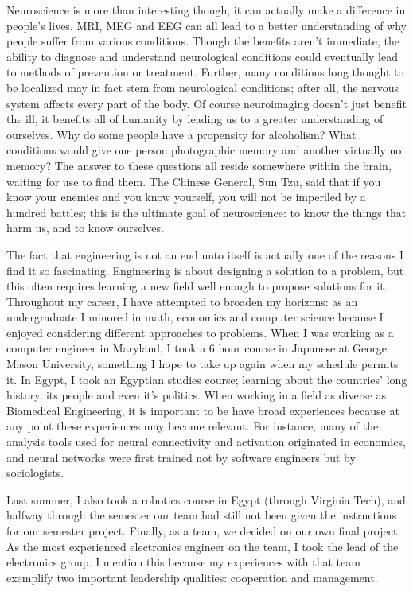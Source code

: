 \documentclass[12pt]{article}
\begin{document}
Neuroscience is more than interesting though, it
can actually make a difference in people's lives. 
MRI, MEG and EEG can all lead to a better 
understanding of why people suffer from various conditions.
Though the benefits aren't immediate,
the ability to diagnose and understand neurological conditions
could eventually lead to methods of prevention or treatment.
Further, many conditions long thought
to be localized may in fact stem from neurological conditions;
after all, the nervous system affects every part of the body.  
Of course neuroimaging doesn't just benefit the ill, it
benefits all of humanity by leading us to a 
greater understanding of
ourselves. Why do some people have a propensity for
alcoholism? What conditions would give one person 
photographic memory and another virtually no memory? 
The answer to these questions all reside somewhere within 
the brain, waiting for use to find them. The Chinese General,
Sun Tzu, said that if you know your enemies and you
know yourself, you will not be imperiled by a hundred battles;
this is the ultimate goal of neuroscience: to know the things
that harm us, and to know ourselves.

\bigskip
The fact that engineering is not an end unto itself
is actually one of the reasons I find it so fascinating. 
Engineering is about designing a solution to a problem, but this
often requires learning a new field well enough
to propose solutions for it. Throughout my career, I have
attempted to broaden my horizons: as an undergraduate
I minored in
math, economics and computer science because I enjoyed considering
different approaches to problems. When I was working 
as a computer engineer in Maryland, I took a 6 hour course
in Japanese at George Mason University, something 
I hope to take up again when my schedule permits it.
In Egypt, I took an Egyptian studies course;
learning about the countries' long history, its people
and even it's politics. When working in a field as diverse as Biomedical
Engineering, it is important to be have broad experiences
because at any point these experiences may become relevant.
For instance, many of the analysis tools used for neural
connectivity and
activation originated in economics, and neural networks were
first trained not by software engineers but by sociologists.

\bigskip
Last summer, I also took a robotics course in Egypt (through
Virginia Tech), and
halfway through the semester our team had still 
not been given the instructions for our semester project.
Finally, as a team, we decided on our own final project.
As the most experienced electronics engineer on the team,
I took the lead of the electronics group. I mention this
because my experiences with that team exemplify two
important leadership qualities: cooperation and management. 
\end{document}
